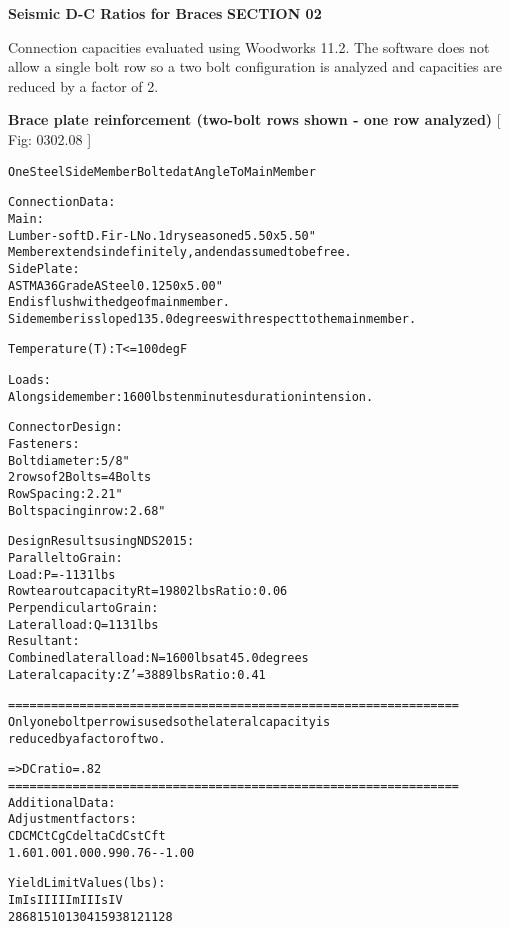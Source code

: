 \documentclass[12pt,notitle,letterpaper]{report}
\renewenvironment{quote}
  {\small\list{}{\rightmargin=0cm \leftmargin=0cm}%
   \item\relax}
  {\endlist}
\begin{document}
\vspace{.2in}   \textbf{Seismic D-C Ratios for Braces}   \hfill\textbf{SECTION 02}
\newline   \vspace{.05in}   {\color{black}\hrulefill}

Connection capacities evaluated using Woodworks 11.2.  The software does not
allow a single bolt row so a two bolt configuration is analyzed and
capacities are reduced by a factor of 2.


\textbf{Brace plate reinforcement (two-bolt rows shown - one row analyzed)} \hfill {[} Fig: 0302.08 {]}

\begin{quote}
\begin{alltt}
One Steel Side Member Bolted at Angle To Main Member

 Connection Data:
    Main:
       Lumber-soft  D.Fir-L No.1  dry seasoned 5.50 x 5.50"
       Member extends indefinitely, and end assumed to be free.
    Side Plate:
       ASTM A36 Grade A Steel   0.1250 x 5.00"
       End is flush with edge of main member.
    Side member is sloped 135.0 degrees with respect to the main member.

    Temperature (T) : T <= 100 deg F

    Loads:
       Along side member:  1600 lbs   ten minutes duration in tension.

 Connector Design:
    Fasteners:
       Bolt diameter: 5/8"
       2 rows of 2 Bolts =  4 Bolts
       Row Spacing:          2.21"
       Bolt spacing in row:  2.68"

 Design Results using NDS 2015:
    Parallel to Grain:
       Load:                     P  = -1131 lbs
       Row tear out capacity     Rt = 19802 lbs  Ratio: 0.06
    Perpendicular to Grain:
       Lateral load:             Q  =  1131 lbs
    Resultant:
       Combined lateral load:    N  =  1600 lbs at 45.0 degrees
       Lateral capacity:         Z' =  3889 lbs  Ratio: 0.41

 ===============================================================
 Only one bolt per row is used so the lateral capacity is
 reduced by a factor of two.

 =>  DC ratio = .82
 ===============================================================
 Additional Data:
    Adjustment factors:
    CD     CM     Ct     Cg   Cdelta   Cd    Cst    Cft
    1.60   1.00   1.00   0.99   0.76    -      -     1.00

    Yield Limit Values (lbs):
       Im        Is        II        IIIm      IIIs      IV
       2868      1510      1304      1593       812      1128
\end{alltt}
\end{quote}
\end{document}

